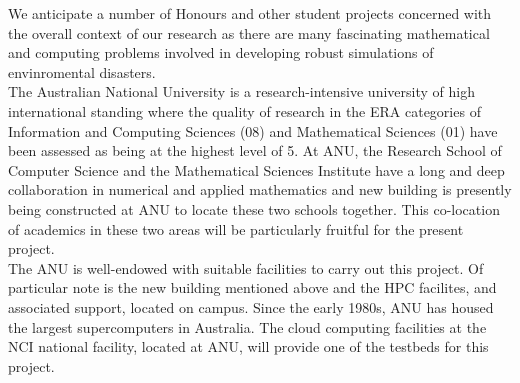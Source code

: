 
We anticipate a number of Honours and other student projects concerned with the overall context of our research as there are many 
fascinating mathematical and computing problems involved in developing robust simulations of envinromental disasters.\\

The Australian National University is a research-intensive university
of high international standing where the quality of research in the ERA categories of 
 Information and Computing
Sciences (08) and Mathematical Sciences (01) have been assessed as
being at the highest level of 5. At ANU, the Research School of
Computer Science and the Mathematical Sciences Institute have a long
and deep collaboration in numerical and applied mathematics and new building is presently being constructed at ANU to
locate these two schools together. This co-location of academics in these two
areas will be particularly fruitful for the present project.\\


The ANU is well-endowed with suitable facilities to carry out this project. Of particular note is the new building mentioned above and the HPC facilites, and associated support, located on campus.
Since the early 1980s, ANU has housed the
largest supercomputers in Australia. The cloud computing facilities at the NCI national
facility, located at ANU, will provide one of the testbeds for this
project.




